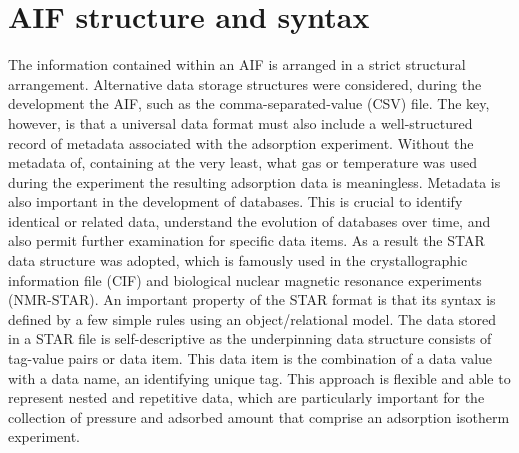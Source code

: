 \documentclass[journal=langd5,manuscript=article]{achemso}
\begin{document}
\section{AIF structure and syntax}
The information contained within an AIF is arranged in a strict structural arrangement.
Alternative data storage structures were considered, during the development the AIF,  such as the comma-separated-value (CSV) file.
The key, however, is that a universal data format must also include a well-structured record of metadata associated with the adsorption experiment.
Without the metadata of, containing at the very least, what gas or temperature was used during the experiment the resulting adsorption data is meaningless.
Metadata is also important in the development of databases.
This is crucial to identify identical or related data, understand the evolution of databases over time, and also permit further examination for specific data items.
As a result the STAR data structure was adopted,\cite{10.1021/ci00019a005} which is famously used in the crystallographic information file (CIF) and biological nuclear magnetic resonance experiments (NMR-STAR).\cite{10.1107/S010876739101067X,10.1007/s10858-018-0220-3}
An important property of the STAR format is that its syntax is defined by a few simple rules using an object/relational model.
The data stored in a STAR file is self-descriptive as the underpinning data structure consists of tag-value pairs or data item.
This data item is the combination of a data value with a data name, an identifying unique tag.
This approach is flexible and able to represent nested and repetitive data, which are particularly important for the collection of pressure and adsorbed amount that comprise an adsorption isotherm experiment.
\end{document}
